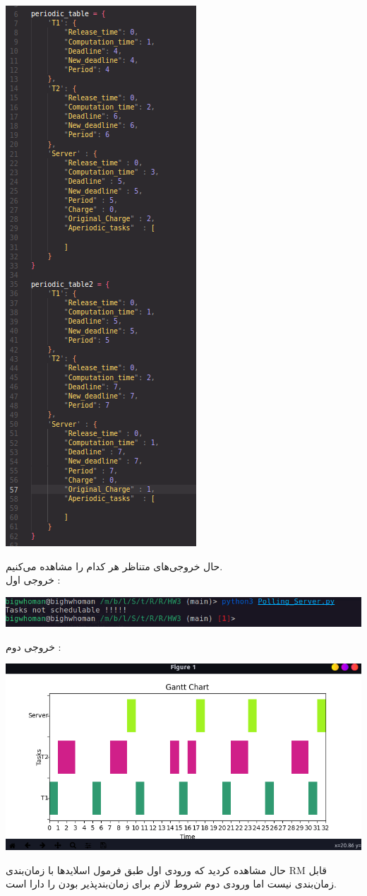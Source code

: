 \begin{center}
  \includegraphics[scale=0.5]{pics/sample.png}
\end{center}
حال خروجی‌های متناظر هر کدام را مشاهده می‌کنیم.\\
خروجی اول :
\begin{center}
  \includegraphics[scale=0.5]{pics/o1.png}
\end{center}
خروجی دوم : 
\begin{center}
  \includegraphics[scale=0.5]{pics/o2.png}
\end{center}

حال مشاهده کردید که ورودی اول طبق فرمول اسلایدها با زمان‌بندی RM قابل 
زمان‌بندی نیست اما ورودی دوم شروط لازم برای زمان‌بند‌پذیر بودن را دارا است.
